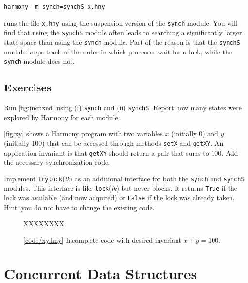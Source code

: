 \documentclass{report}
\newcommand{\harmonysource}[1]{
\begin{tabbing}
XX\=XXX\=XXX\kill
    
\end{tabbing}
}
\newcommand{\harmonylink}[1]{%
[\href{https://www.cs.cornell.edu/home/rvr/harmony/#1}{\underline{#1}}]%
}
\newenvironment{code}{
\tcolorbox
}{
\endtcolorbox
}
\begin{document}
\begin{code}
\begin{verbatim}
harmony -m synch=synchS x.hny
\end{verbatim}
\end{code}

runs the file \texttt{x.hny} using the suspension version of the \texttt{synch} module.
You will find that using the \texttt{synchS} module often leads to searching a
significantly larger state space than using the \texttt{synch} module.
Part of the reason is that the \texttt{synchS} module keeps track of the order
in which processes wait for a lock, while the \texttt{synch} module does not.

\section*{Exercises}
\begin{problems}
\item
Run \autoref{fig:incfixed} using (i) \texttt{synch} and (ii) \texttt{synchS}.
Report how many states were explored by Harmony for each module.
\item \label{ex:xy} \autoref{fig:xy} shows a Harmony program with two variables $x$
(initially 0) and $y$ (initially 100) that can be accessed through methods
\texttt{setX} and \texttt{getXY}.  An application invariant is that \texttt{getXY}
should return a pair that sums to 100.  Add the necessary synchronization code.
\item \label{ex:trylock} Implement \texttt{trylock}(\textit{lk}) as an additional
interface for both the \texttt{synch} and \texttt{synchS} modules.
This interface is like \texttt{lock}(\textit{lk}) but never blocks.  It
returns \texttt{True} if the lock was available (and now acquired) or \texttt{False}
if the lock was already taken.
Hint: you do not have to change the existing code.
\end{problems}

\begin{figure}
\begin{code}
\harmonysource{xy}
\end{code}
\caption{\harmonylink{code/xy.hny} Incomplete code with desired invariant $x + y = 100$.}
\label{fig:xy}
\end{figure}

\chapter{Concurrent Data Structures}
\label{ch:cds}
\end{document}
